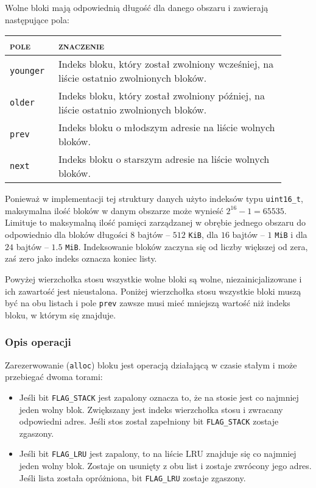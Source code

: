 \documentclass[12pt,a4paper,titlepage,twoside]{mwart}
\begin{document}
Wolne bloki mają odpowiednią długość dla danego obszaru i zawierają następujące pola:

\begin{center}
\begin{tabular}{|m{0.15\linewidth}|p{0.75\linewidth}|}
\hline
\textsc{pole} & \textsc{znaczenie} \\
\hline
\hline
\verb+younger+	& Indeks bloku, który został zwolniony wcześniej, na liście ostatnio zwolnionych bloków. \\
\hline
\verb+older+	& Indeks bloku, który został zwolniony później, na liście ostatnio zwolnionych bloków. \\
\hline
\verb+prev+		& Indeks bloku o młodszym adresie na liście wolnych bloków. \\
\hline
\verb+next+		& Indeks bloku o starszym adresie na liście wolnych bloków. \\
\hline
\end{tabular}
\end{center}

Ponieważ w implementacji tej struktury danych użyto indeksów typu
\verb+uint16_t+, maksymalna ilość bloków w danym obszarze może wynieść $2^{16}
- 1 = 65535$. Limituje to maksymalną ilość pamięci zarządzanej w obrębie
jednego obszaru do odpowiednio dla bloków długości $8$ bajtów -- $512$
\verb+KiB+, dla $16$ bajtów -- $1$ \verb+MiB+ i dla $24$ bajtów -- $1.5$
\verb+MiB+. Indeksowanie bloków zaczyna się od liczby większej od zera, zaś
zero jako indeks oznacza koniec listy.

Powyżej wierzchołka stosu wszystkie wolne bloki są wolne, niezainicjalizowane i
ich zawartość jest nieustalona. Poniżej wierzchołka stosu wszystkie bloki muszą
być na obu listach i pole \verb+prev+ zawsze musi mieć mniejszą wartość niż
indeks bloku, w którym się znajduje.

\subsubsection{Opis operacji}

Zarezerwowanie (\verb+alloc+) bloku jest operacją działającą w czasie stałym i
może przebiegać dwoma torami:
\begin{itemize}
\item Jeśli bit \verb+FLAG_STACK+ jest zapalony oznacza to, że na stosie jest
co najmniej jeden wolny blok. Zwiększany jest indeks wierzchołka stosu i
zwracany odpowiedni adres. Jeśli stos został zapełniony bit \verb+FLAG_STACK+
zostaje zgaszony.
\item Jeśli bit \verb+FLAG_LRU+ jest zapalony, to na liście LRU znajduje się
co najmniej jeden wolny blok. Zostaje on usunięty z obu list i zostaje zwrócony
jego adres. Jeśli lista została opróżniona, bit \verb+FLAG_LRU+ zostaje
zgaszony.
\end{itemize}
\end{document}
